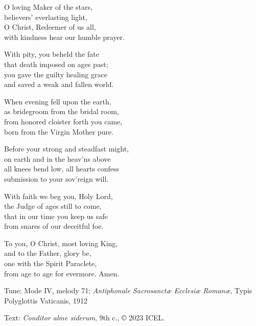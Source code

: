 \hymn

\settowidth{\versewidth}{Before your strong and steadfast might,}

\begin{hymnverse}[\versewidth]
O loving Maker of the stars,\\
believers’ everlasting light,\\
O Christ, Redeemer of us all,\\
with kindness hear our humble prayer.

With pity, you beheld the fate\\
that death imposed on ages past;\\
you gave the guilty healing grace\\
and saved a weak and fallen world.

When evening fell upon the earth,\\
as bridegroom from the bridal room,\\
from honored cloister forth you came,\\
born from the Virgin Mother pure.

Before your strong and steadfast might,\\
on earth and in the heav’ns above\\
all knees bend low, all hearts confess\\
submission to your sov’reign will.

With faith we beg you, Holy Lord,\\
the Judge of ages still to come,\\
that in our time you keep us safe\\
from snares of our deceitful foe.

To you, O Christ, most loving King,\\
and to the Father, glory be,\\
one with the Spirit Paraclete,\\
from age to age for evermore. Amen.
\end{hymnverse}

\begin{hymnsource}
Tune: Mode IV, melody 71; \emph{Antiphonale Sacrosanctæ Ecclesiæ Romanæ}, Typis Polyglottis Vaticanis, 1912

Text: \emph{Conditor alme siderum}, 9th c., © 2023 ICEL.
\end{hymnsource}